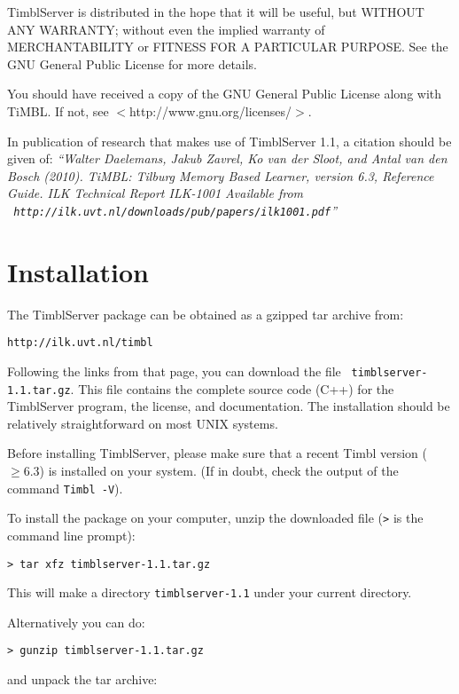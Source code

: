 \documentclass{report}
\begin{document}
TimblServer is distributed in the hope that it will be useful, but WITHOUT ANY WARRANTY; without even the implied warranty of MERCHANTABILITY or FITNESS FOR A PARTICULAR PURPOSE.  See the GNU General Public License for more details.

You should have received a copy of the GNU General Public License along with TiMBL.  If not, see $<$http://www.gnu.org/licenses/$>$.

In publication of research that makes use of TimblServer 1.1, a citation should be given of: {\em ``Walter Daelemans, Jakub Zavrel, Ko van der
  Sloot, and Antal van den Bosch (2010). TiMBL: Tilburg Memory Based
  Learner, version 6.3, Reference Guide. ILK Technical Report ILK-1001
  Available from \\ {\tt
    http://ilk.uvt.nl/downloads/pub/papers/ilk1001.pdf}''}

\pagestyle{headings}

\chapter{Installation}


\vspace{-1cm}
The TimblServer package can be obtained as a gzipped tar archive from:

{\tt http://ilk.uvt.nl/timbl}

Following the links from that page, you can download the file {\tt
  timblserver-1.1.tar.gz}. This file contains the complete source code
(C++) for the TimblServer program, the license, and documentation. The
installation should be relatively straightforward on most UNIX
systems.

Before installing TimblServer, please make sure that a recent Timbl
version ($\geq 6.3$) is installed on your system. (If in doubt, check
the output of the command {\tt Timbl -V}).

To install the package on your computer, unzip the downloaded file ({\tt >} is the command line prompt):

{\tt > tar xfz timblserver-1.1.tar.gz}

This will make a directory {\tt timblserver-1.1} under your current directory.

Alternatively you can do:

{\tt > gunzip timblserver-1.1.tar.gz}

and unpack the tar archive:
\end{document}
